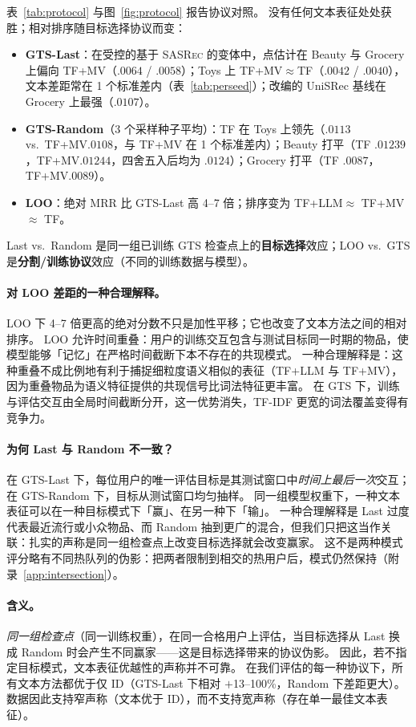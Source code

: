 \documentclass[sigconf,natbib=true,anonymous]{acmart}
\newcommand{\tfidf}{\textsc{TF-IDF}\xspace}
\newcommand{\tfllm}{\textsc{TF+LLM}\xspace}
\newcommand{\tfmv}{\textsc{TF+MV}\xspace}
\newcommand{\base}{\textsc{SASRec}\xspace}
\begin{document}
表~\ref{tab:protocol} 与图~\ref{fig:protocol} 报告协议对照。
没有任何文本表征处处获胜；相对排序随目标选择协议而变：

\begin{itemize}[leftmargin=*,itemsep=1pt]
\item \textbf{GTS-Last}：在受控的基于 \base 的变体中，点估计在 Beauty 与 Grocery 上偏向 \tfmv（$.0064$ / $.0058$）；Toys 上 TF+MV${}\approx{}$TF（$.0042$ / $.0040$），文本差距常在 1 个标准差内（表~\ref{tab:perseed}）；改编的 UniSRec 基线在 Grocery 上最强（$.0107$）。
\item \textbf{GTS-Random}（3 个采样种子平均）：TF 在 Toys 上领先（$.0113$ vs.\ \tfmv $.0108$，与 \tfmv 在 1 个标准差内）；Beauty 打平（TF $.01239$，\tfmv $.01244$，四舍五入后均为 $.0124$）；Grocery 打平（TF $.0087$，\tfmv $.0089$）。
\item \textbf{LOO}：绝对 MRR 比 GTS-Last 高 4--7 倍；排序变为 \tfllm $\approx$ \tfmv $\approx$ TF。
\end{itemize}
Last vs.\ Random 是同一组已训练 GTS 检查点上的\textbf{目标选择}效应；LOO vs.\ GTS 是\textbf{分割/训练协议}效应（不同的训练数据与模型）。

\paragraph{对 LOO 差距的一种合理解释。}
LOO 下 4--7 倍更高的绝对分数不只是加性平移；它也改变了文本方法之间的相对排序。
LOO 允许时间重叠：用户的训练交互包含与测试目标同一时期的物品，使模型能够「记忆」在严格时间截断下本不存在的共现模式。
一种合理解释是：这种重叠不成比例地有利于捕捉细粒度语义相似的表征（\tfllm 与 \tfmv），因为重叠物品为语义特征提供的共现信号比词法特征更丰富。
在 GTS 下，训练与评估交互由全局时间截断分开，这一优势消失，\tfidf 更宽的词法覆盖变得有竞争力。

\paragraph{为何 Last 与 Random 不一致？}
在 GTS-Last 下，每位用户的唯一评估目标是其测试窗口中\emph{时间上最后一次}交互；在 GTS-Random 下，目标从测试窗口均匀抽样。
同一组模型权重下，一种文本表征可以在一种目标模式下「赢」、在另一种下「输」。
一种合理解释是 Last 过度代表最近流行或小众物品、而 Random 抽到更广的混合，但我们只把这当作关联：扎实的声称是同一组检查点上改变目标选择就会改变赢家。
这不是两种模式评分略有不同热队列的伪影：把两者限制到相交的热用户后，模式仍然保持（附录~\ref{app:intersection}）。

\paragraph{含义。}
\emph{同一组检查点}（同一训练权重），在同一合格用户上评估，当目标选择从 Last 换成 Random 时会产生不同赢家——这是目标选择带来的协议伪影。
因此，若不指定目标模式，文本表征优越性的声称并不可靠。
在我们评估的每一种协议下，所有文本方法都优于仅 ID（GTS-Last 下相对 $+$13--100\%，Random 下差距更大）。
数据因此支持窄声称（文本优于 ID），而不支持宽声称（存在单一最佳文本表征）。
\end{document}

